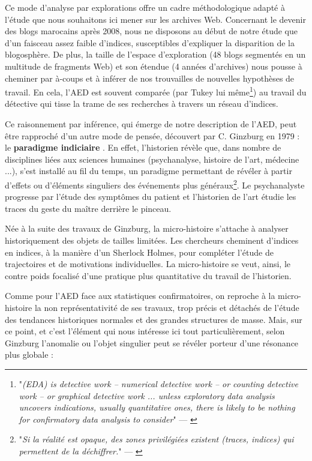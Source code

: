 \documentclass[symmetric,justified,marginals=raggedouter]{tufte-book}
\begin{document}
\noindent Ce mode d'analyse par explorations offre un cadre méthodologique adapté à l'étude que nous souhaitons ici mener sur les archives Web. Concernant le devenir des blogs marocains après 2008, nous ne disposons au début de notre étude que d'un faisceau assez faible d'indices, susceptibles d'expliquer la disparition de la blogosphère. De plus, la taille de l'espace d'exploration (48 blogs segmentés en un multitude de fragments Web) et son étendue (4 années d'archives) nous pousse à cheminer par à-coups et à inférer de nos trouvailles de nouvelles hypothèses de travail. En cela, l'AED est souvent comparée (par Tukey lui même\footnote{"\textit{(EDA) is detective work – numerical detective work – or counting detective work – or graphical detective work ... unless exploratory data analysis uncovers indications, usually quantitative ones, there is likely to be nothing for confirmatory data analysis to consider}" --- \citep[p.1-3]{tukey_exploratory_1977}}) au travail du détective qui tisse la trame de ses recherches à travers un réseau d'indices. 

Ce raisonnement par inférence, qui émerge de notre description de l'AED, peut être rapproché d'un autre mode de pensée, découvert par C. Ginzburg en 1979 : le \textbf{paradigme indiciaire} \citep{ginzburg_signes_1980}. En effet, l'historien révèle que, dans nombre de disciplines liées aux sciences humaines (psychanalyse, histoire de l'art, médecine ...), s'est installé au fil du temps, un paradigme permettant de révéler à partir d'effets ou d'éléments singuliers des événements plus généraux\footnote{"\textit{Si la réalité est opaque, des zones privilégiées existent (traces, indices) qui permettent de la déchiffrer.}" --- \citep[p290]{ginzburg_mythes_2012}}. Le psychanalyste progresse par l'étude des symptômes du patient et l'historien de l'art étudie les traces du geste du maître derrière le pinceau.

Née à la suite des travaux de Ginzburg, la micro-histoire s'attache à analyser historiquement des objets de tailles limitées. Les chercheurs cheminent d'indices en indices, à la manière d'un Sherlock Holmes, pour compléter l'étude de trajectoires et de motivations individuelles. La micro-histoire se veut, ainsi, le contre poids focalisé d'une pratique plus quantitative du travail de l'historien. 

Comme pour l'AED face aux statistiques confirmatoires, on reproche à la micro-histoire la non représentativité de ses travaux, trop précis et détachés de l'étude des tendances historiques normales et des grandes structures de masse. Mais, sur ce point, et c'est l'élément qui nous intéresse ici tout particulièrement, selon Ginzburg l'anomalie ou l'objet singulier peut se révéler porteur d'une résonance plus globale :\\
\end{document}
